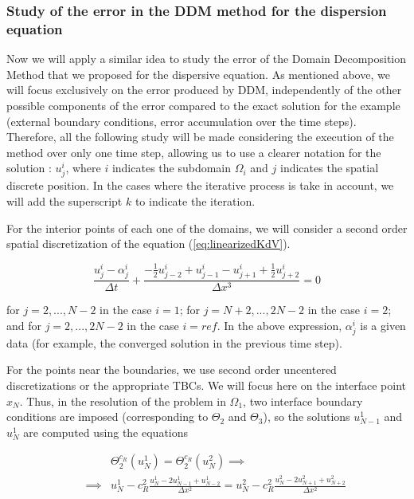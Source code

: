 \subsubsection{Study of the error in the DDM method for the dispersion equation}

\indent Now we will apply a similar idea to study the error of the Domain Decomposition Method that we proposed for the dispersive equation. As mentioned above, we will focus exclusively on the error produced by DDM, independently of the other possible components of the error compared to the exact solution for the example (external boundary conditions, error accumulation over the time steps). Therefore, all the following study will be made considering the execution of the method over only one time step, allowing us to use a clearer notation for the solution : $u_j^i$, where $i$ indicates the subdomain $\Omega_i$ and $j$ indicates the spatial discrete position. In the cases where the iterative process is take in account, we will add the superscript $k$ to indicate the iteration.

\indent For the interior points of each one of the domains, we will consider a second order spatial discretization of the equation (\ref{eq:linearizedKdV}).

\begin{equation}
    \label{eq:FDdiscretization}
    \frac{u_j^i - \alpha_j^i}{\Delta t} + \frac{-\frac{1}{2}u_{j-2}^i + u_{j-1}^i - u_{j+1}^i + \frac{1}{2}u_{j+2}^i }{\Delta x ^3} = 0
\end{equation}

\indent for $j=2,...,N-2$ in the case $i=1$; for $j=N+2,...,2N-2$ in the case $i=2$; and for $j=2,...,2N-2$ in the case $i=ref$. In the above expression, $\alpha_j^i$ is a given data (for example, the converged solution in the previous time step).

\indent For the points near the boundaries, we use second order uncentered discretizations or the appropriate TBCs. We will focus here on the interface point $x_N$. Thus, in the resolution of the problem in $\Omega_1$, two interface boundary conditions are imposed (corresponding to $\Theta_2$ and $\Theta_3$), so the solutions $u_{N-1}^1$ and $u_N^1$ are computed using the equations

\begin{equation}
	\begin{aligned}
    \label{eq:TBCsIterOmega1A}
    && 				&\Theta_2^{c_R}(u_N^1) = \Theta_2^{c_R}(u_N^2) \implies \\ 
    && \implies & u_N^1 - c_R^2 \frac{u_N^1 - 2u_{N-1}^1 + u_{N-2}^1}{\Delta x^2} = u_N^2 - c_R^2 \frac{u_N^2 - 2u_{N+1}^2 + u_{N+2}^2}{\Delta x^2} 
    \end{aligned}
\end{equation}

